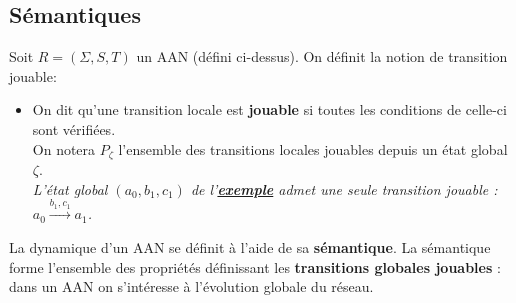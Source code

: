 \documentclass[10pt,a4paper]{article}
\begin{document}
\subsection{Sémantiques}
\hypertarget{semantiques}{Soit $R = (\Sigma,S,T)$ un AAN (défini ci-dessus). On définit la notion de transition jouable:}
\begin{itemize}
	\item On dit qu'une transition locale est \textbf{jouable} si toutes les conditions de celle-ci sont vérifiées.\\
	On notera $P_{\zeta}$ l'ensemble des transitions locales jouables depuis un état global $\zeta$.\\
	\emph{L'état global $(a_0,b_1,c_1)$ de l'\hyperlink{exemple}{\textbf{exemple}} admet une seule transition jouable : $a_0\xrightarrow{b_1,c_1} a_1$.}
\end{itemize}
La dynamique d'un AAN se définit à l'aide de sa \textbf{sémantique}. La sémantique forme l'ensemble des propriétés définissant les \textbf{transitions globales jouables} : dans un AAN on s'intéresse à l'évolution globale du réseau.
\end{document}
